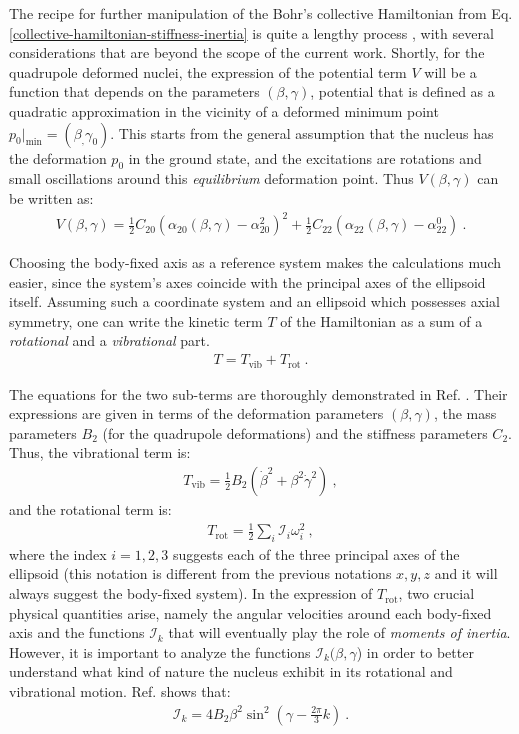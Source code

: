 The recipe for further manipulation of the Bohr's collective Hamiltonian from Eq. \ref{collective-hamiltonian-stiffness-inertia} is quite a lengthy process \cite{bohr1998nuclear,ring2004nuclear}, with several considerations that are beyond the scope of the current work. Shortly, for the quadrupole deformed nuclei, the expression of the potential term $V$ will be a function that depends on the parameters $(\beta,\gamma)$, potential that is defined as a quadratic approximation in the vicinity of a deformed minimum point $p_0|_\text{min}=(\beta_,\gamma_0)$. This starts from the general assumption that the nucleus has the deformation $p_0$ in the ground state, and the excitations are rotations and small oscillations around this \emph{equilibrium} deformation point. Thus $V(\beta,\gamma)$ can be written as:
\begin{align}
    V(\beta,\gamma)=\frac{1}{2}C_{20}\left(\alpha_{20}(\beta,\gamma)-\alpha_{20}^2\right)^2+\frac{1}{2}C_{22}\left(\alpha_{22}(\beta,\gamma)-\alpha_{22}^0\right)\ .
\end{align}

Choosing the body-fixed axis as a reference system makes the calculations much easier, since the system's axes coincide with the principal axes of the ellipsoid itself. Assuming such a coordinate system and an ellipsoid which possesses axial symmetry, one can write the kinetic term $T$ of the Hamiltonian as a sum of a \emph{rotational} and a \emph{vibrational} part.
\begin{align}
    T=T_\text{vib}+T_\text{rot}\ .
\end{align}

The equations for the two sub-terms are thoroughly demonstrated in Ref. \cite{li2022model}. Their expressions are given in terms of the deformation parameters $(\beta,\gamma)$, the mass parameters $B_2$ (for the quadrupole deformations) and the stiffness parameters $C_2$. Thus, the vibrational term is:
\begin{align}
    T_\text{vib}=\frac{1}{2}B_2\left(\dot{\beta}^2+\beta^2\dot{\gamma}^2\right)\ ,
    \label{kinetic-vibrational-energy-collective}
\end{align}
and the rotational term is:
\begin{align}
    T_\text{rot}=\frac{1}{2}\sum_i\mathcal{I}_i\omega_i^2\ ,
    \label{kinetic-rotational-energy-collective}
\end{align}
where the index $i=1,2,3$ suggests each of the three principal axes of the ellipsoid (this notation is different from the previous notations $x,y,z$ and it will always suggest the body-fixed system). In the expression of $T_\text{rot}$, two crucial physical quantities arise, namely the angular velocities around each body-fixed axis and the functions $\mathcal{I}_k$ that will eventually play the role of \emph{moments of inertia}. However, it is important to analyze the functions $\mathcal{I}_k(\beta,\gamma$) in order to better understand what kind of nature the nucleus exhibit in its rotational and vibrational motion. Ref. \cite{ring2004nuclear} shows that:
\begin{align}
    \mathcal{I}_k=4B_2\beta^2\sin^2\left(\gamma-\frac{2\pi}{3}k\right)\ .
\end{align}


